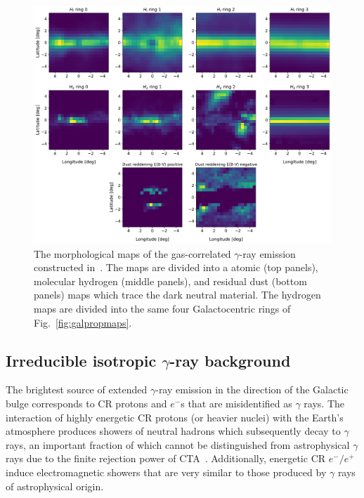 \documentclass[doublespace,draft,nopageskip]{VTthesis} %
\begin{document}
\begin{figure}
    \begin{center}
    \includegraphics[scale = 0.50]{Figures/CTA/maps_mis.pdf}
    \caption{The morphological maps of the gas-correlated $\gamma$-ray emission constructed in~\citet{Macias:2016nev}. The maps are divided into a atomic (top panels), molecular hydrogen (middle panels), and residual dust (bottom panels) maps which trace the dark neutral material. The hydrogen maps are divided into the same four Galactocentric rings of Fig.~\ref{fig:galpropmaps}.}
    \label{fig:hydro_maps}
    \end{center}
\end{figure}

\subsection{Irreducible isotropic $\gamma$-ray background}
The brightest source of extended $\gamma$-ray emission in the direction of the Galactic bulge corresponds to CR protons and $e^{-}$s that are misidentified as $\gamma$ rays. The interaction of highly energetic CR protons (or heavier nuclei) with the Earth's atmosphere produces showers of neutral hadrons which subsequently decay to $\gamma$ rays, an important fraction of which cannot be distinguished from astrophysical $\gamma$ rays due to the finite rejection power of CTA~\citep{Acharyya:2020sbj,Rinchiuso:2020skh}. Additionally, energetic CR $e^{-}/e^{+}$ induce electromagnetic showers that are very similar to those produced by $\gamma$ rays of astrophysical origin. 
\end{document}
